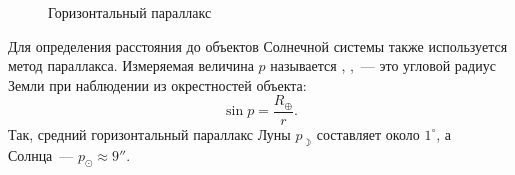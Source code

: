 \begin{wrapfigure}[6]{r}{0.45\tw}
	\centering
	\vspace{-1.5pc}
		\caption{Горизонтальный параллакс}
		\label{pic:horizontal-parallax}
\end{wrapfigure}
Для определения расстояния до объектов Солнечной системы также используется метод параллакса. Измеряемая величина $p$ называется , ,~--- это угловой радиус Земли при наблюдении из окрестностей объекта:
\begin{equation}
	\sin p =\frac{R_\oplus}{r}.
\end{equation}
Так, средний горизонтальный параллакс Луны $p_{\rightmoon}$ составляет около $1^\circ$, а Солнца~--- $p_\odot \approx 9''$.
